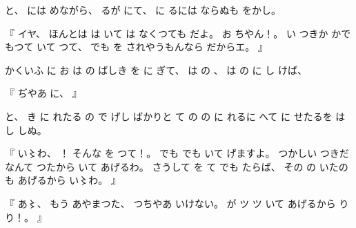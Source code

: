 %
と、
%
には
めながら、
%
るが
にて、
%
に
るには
ならぬも
をかし。

%
『
イヤ、
%
ほんとは
は
いて
は
なくつても
だよ。
%
お
ちやん！。
%
い
つきか
かで
もつて
いて
つて、
%
でも
を
されやうもんなら
だからエ。
』

%
かくいふ
に
お
は
の
ばしき
を
に
ぎて、
%
は%
の
、
%
は%
の%
に
し
けば、

%
『
ぢやあ
に、
』

%
と、
%
き
に
れたる
の
で
げし
ばかりと
て
の
の%
に
れるに
へて
に
せたるを
は
し
しぬ。

%
『
い〻わ、%
%
！\inhibitglue{}%
そんな
を
つて！。
%
でも
でも
いて
げますよ。
%
つかしい
つきだなんて
つたから
いて
あげるわ。
%
さうして
を
て
でも
たらば、
%
その
の
いたのも
あげるから
い〻わ。%
』

%
『
あ〻、%
%
もう
あやまつた、
%
つちやあ
いけない。
%
が
ツ
ツ
いて
あげるから
り
り！。
』

